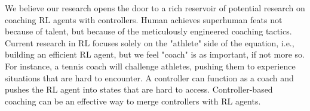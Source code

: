 \documentclass[journal]{IEEEtran}
\begin{document}
We believe our research opens the door to a rich reservoir of potential research on coaching RL agents with controllers. Human achieves superhuman feats not because of talent, but because of the meticulously engineered coaching tactics. Current research in RL focuses solely on the "athlete" side of the equation, i.e., building an efficient RL agent, but we feel "coach" is as important, if not more so.  For instance, a tennis coach will challenge athletes, pushing them to experience situations that are hard to encounter. A controller can function as a coach and pushes the RL agent into states that are hard to access. Controller-based coaching can be an effective way to merge controllers with RL agents. 



\end{document}
